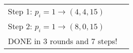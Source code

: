 \begin{center}
\begin{tabular}{ll}
		\noindent\hspace*{22mm}			Step 1: $p_i = 1 \rightarrow (4, 4, 15)$    \\
		\noindent\hspace*{22mm}			Step 2: $p_i = 1 \rightarrow (8, 0, 15)$    \\
		DONE in 3 rounds and 7 steps!                                            \\
	\end{tabular} \\
	\label{table:example}
\end{center}
